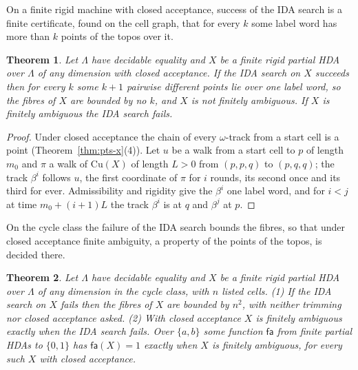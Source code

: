\documentclass{lmcs}
\newtheorem{theorem}{Theorem}[section]
\theoremstyle{definition}
\theoremstyle{remark}
\newcommand{\ab}{\{a,b\}}
\providecommand{\Cu}[1]{\mathrm{Cu}(#1)}
\begin{document}
On a finite rigid machine with closed acceptance, success of the IDA search is a finite certificate, found on the
cell graph, that for every $k$ some label word has more than $k$
points of the topos over it.

\begin{theorem}\label{thm:ida}
Let $\Lambda$ have decidable equality and $X$ be a finite rigid partial HDA over $\Lambda$ of any dimension with
closed acceptance. If the IDA search on $X$ succeeds then for every $k$ some $k+1$ pairwise different points lie
over one label word, so the fibres of $X$ are bounded by
no $k$, and $X$ is not finitely
ambiguous. If $X$ is finitely ambiguous the IDA search
fails.
\end{theorem}

\begin{proof}
Under closed acceptance the chain of every $\omega$-track from a start cell is a point
(Theorem~\ref{thm:pts-x}(4)). Let $u$ be a walk from a start cell to $p$ of length
$m_0$ and $\pi$ a walk of $\Cu{X}$ of length $L>0$ from $(p,p,q)$ to $(p,q,q)$; the
track $\beta^i$ follows $u$, the first coordinate of $\pi$ for $i$ rounds, its second once and its third for ever.
Admissibility and rigidity give the $\beta^i$ one label word, and for
$i<j$ at time $m_0+(i+1)L$ the track $\beta^i$ is at $q$ and $\beta^j$ at
$p$.
\end{proof}

On the cycle class the failure of the IDA search bounds the fibres, so that under closed acceptance finite
ambiguity, a property of the points of the topos, is decided there.

\begin{theorem}\label{thm:cyc}
Let $\Lambda$ have decidable equality and $X$ be a finite rigid partial HDA over $\Lambda$ of any dimension in the
cycle class, with $n$ listed cells.
(1) If the IDA search on $X$ fails then the fibres of $X$ are bounded by $n^2$, with neither trimming nor closed
  acceptance asked.
(2) With closed acceptance $X$ is finitely ambiguous exactly when the IDA search
  fails. Over $\ab$ some function $\mathsf{fa}$ from finite partial HDAs to
  $\{0,1\}$ has $\mathsf{fa}(X)=1$ exactly when $X$ is finitely ambiguous, for every such $X$ with closed
  acceptance.
\end{theorem}
\end{document}
